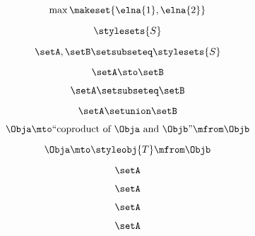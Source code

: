 \begin{forslides}
    \begin{equation}
        \label{eq:combination-143}
        \max\makeset{\elna{1},\elna{2}}
    \end{equation}
    
     \begin{equation}
        \label{eq:combination-144}
        \stylesets{S}
    \end{equation}
    
     \begin{equation}
        \label{eq:combination-145}
        \setA,\setB\setsubseteq \stylesets{S}
    \end{equation}
    
    \begin{equation}
        \label{eq:combination-146}
        \setA \sto \setB
    \end{equation}
    
     \begin{equation}
        \label{eq:combination-147}
        \setA\setsubseteq \setB
    \end{equation}
    
     \begin{equation}
        \label{eq:combination-148}
        \setA\setunion\setB
    \end{equation}
    
    \begin{equation}
        \label{eq:combination-149}
        \Obja \mto \text{``coproduct of } \Obja \text{ and } \Objb \text{''}  \mfrom \Objb
    \end{equation}
    
       \begin{equation}
        \label{eq:combination-150}
         \Obja \mto \styleobj{T} \mfrom \Objb
    \end{equation}
       
     \begin{equation}
        \label{eq:combination-151}
        \setA
    \end{equation}
    
     \begin{equation}
        \label{eq:combination-152}
        \setA
    \end{equation}
    
    \begin{equation}
        \label{eq:combination-153}
        \setA
    \end{equation}
    
     \begin{equation}
        \label{eq:combination-154}
        \setA
    \end{equation}
    

\end{forslides}
